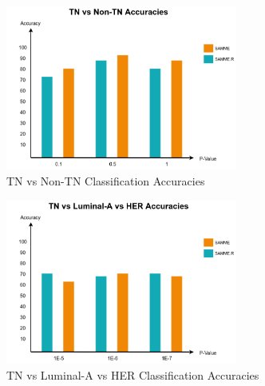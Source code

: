 \documentclass[final,1p,times,twocolumn]{elsarticle}
\begin{document}
\begin{figure}
\centering
\includegraphics[width=3in]{acc1.png}
\caption{TN vs Non-TN Classification Accuracies}
\label{img5}
\end{figure}

\begin{figure}
\centering
\includegraphics[width=3in]{acc2.png}
\caption{TN vs Luminal-A vs HER Classification Accuracies}
\label{img6}
\end{figure}














\end{document}
